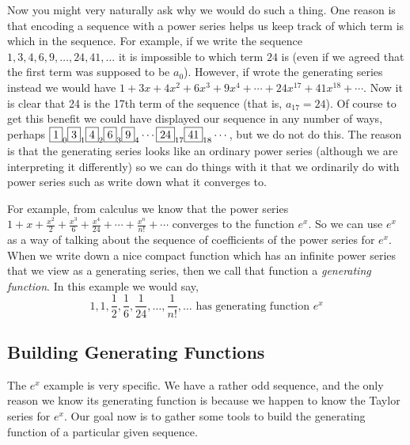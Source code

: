 \documentclass[12pt]{article}
\begin{document}
Now you might very naturally ask why we would do such a thing.  One reason is that encoding a sequence with a power series helps us keep track of which term is which in the sequence.  For example, if we write the sequence $1, 3, 4, 6, 9, \ldots, 24, 41,\ldots$ it is impossible to which term $24$ is (even if we agreed that the first term was supposed to be $a_0$).  However, if wrote the generating series instead we would have $1 + 3x + 4x^2 + 6x^3 + 9x^4 + \cdots + 24 x^{17} + 41 x^{18} + \cdots$.  Now it is clear that 24 is the 17th term of the sequence (that is, $a_{17} = 24$).  Of course to get this benefit we could have displayed our sequence in any number of ways, perhaps $\fbox{1}_0 \fbox{3}_1 \fbox{4}_2 \fbox{6}_3 \fbox{9}_4 \cdots \fbox{24}_{17}\fbox{41}_{18}\cdots$, but we do not do this. The reason is that the generating series looks like an ordinary power series (although we are interpreting it differently) so we can do things with it that we ordinarily do with power series such as write down what it converges to.

For example, from calculus we know that the power series $1 + x + \frac{x^2}{2} + \frac{x^3}{6} + \frac{x^4}{24} + \cdots + \frac{x^n}{n!} + \cdots$ converges to the function $e^x$.  So we can use $e^x$ as a way of talking about the sequence of coefficients of the power series for $e^x$.  When we write down a nice compact function which has an infinite power series that we view as a generating series, then we call that function a {\em generating function}.  In this example we would say,
\[1, 1, \frac{1}{2}, \frac{1}{6}, \frac{1}{24}, \ldots, \frac{1}{n!}, \ldots \mbox{ has generating function } e^x\]

\subsection{Building Generating Functions}

The $e^x$ example is very specific.  We have a rather odd sequence, and the only reason we know its generating function is because we happen to know the Taylor series for $e^x$.  Our goal now is to gather some tools to build the generating function of a particular given sequence.
 
\end{document}
